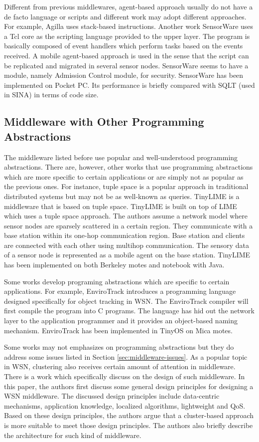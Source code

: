 Different from previous middlewares, agent-based approach usually do not have a de facto language or scripts and different work may adopt different approaches. For example, Agilla uses stack-based instructions. Another work SensorWare \cite{sensorware} uses a Tcl core as the scripting language provided to the upper layer. The program is basically composed of event handlers which perform tasks based on the events received. A mobile agent-based approach is used in the sense that the script can be replicated and migrated in several sensor nodes. SensorWare seems to have a module, namely Admission Control module, for security. SensorWare has been implemented on Pocket PC. Its performance is briefly compared with SQLT (used in SINA) in terms of code size.

\subsection{Middleware with Other Programming Abstractions}
The middleware listed before use popular and well-understood programming abstractions. There are, however, other works that use programming abstractions which are more specific to certain applications or are simply not as popular as the previous ones. For instance, tuple space is a popular approach in traditional distributed systems but may not be as well-known as queries. TinyLIME \cite{tinylime} is a middleware that is based on tuple space. TinyLIME is built on top of LIME which uses a tuple space approach. The authors assume a network model where sensor nodes are sparsely scattered in a certain region. They communicate with a base station within its one-hop communication region. Base station and clients are connected with each other using multihop communication. The sensory data of a sensor node is represented as a mobile agent on the base station. TinyLIME has been implemented on both Berkeley motes and notebook with Java.

Some works develop programing abstractions which are specific to certain applications. For example, EnviroTrack \cite{envirotrack} introduces a programming language designed specifically for object tracking in WSN. The EnviroTrack compiler will first compile the program into C programs. The language has hid out the network layer to the application programmer and it provides an object-based naming mechanism. EnviroTrack has been implemented in TinyOS on Mica motes.

Some works may not emphasizes on programming abstractions but they do address some issues listed in Section \ref{sec:middleware-issues}. As a popular topic in WSN, clustering also receives certain amount of attention in middleware. There is a work \cite{clustermiddleware} which specifically discuss on the design of such middleware. In this paper, the authors first discuss some general design principles for designing a WSN middleware. The discussed design principles include data-centric mechanisms, application knowledge, localized algorithms, lightweight and QoS. Based on these design principles, the authors argue that a cluster-based approach is more suitable to meet those design principles. The authors also briefly describe the architecture for such kind of middleware.

